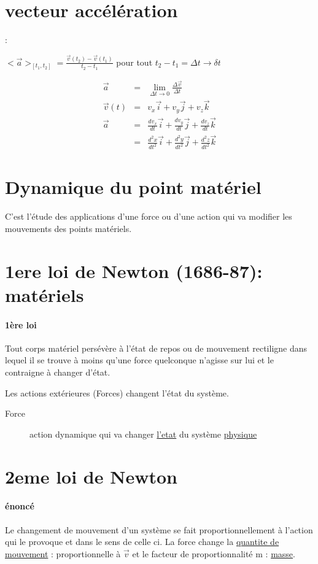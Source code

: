 \section{vecteur accélération} : 

$<\vec{a}>_{[t_1, t_2]} = \frac{\vec{v}(t_2)-\vec{v}(t_1)}{t_2-t_1}$ pour tout $t_2-t_1 = \Delta t \to \delta t$

\[\begin{array}{rcl}
	\vec{a} &=& \lim_{\Delta t \to 0} \frac{\Delta \vec{v}}{\Delta t} \\
		\vec{v}(t) &=& v_x\vec{i}+v_y\vec{j} + v_z\vec{k} \\
		\vec{a} &=& \frac{dv_x}{dt}\vec{i}+\frac{dv_y}{dt}\vec{j}+\frac{dv_z}{dt}\vec{k} \\
		&=& \frac{d^2x}{dt^2}\vec{i}+\frac{d^2y}{dt^2}\vec{j}+\frac{d^2z}{dt^2}\vec{k} 
\end{array}\]

\section{Dynamique du point matériel}

C'est l'étude des applications d'une force ou d'une action qui va modifier les mouvements des points matériels.
\section{1ere loi de Newton (1686-87): matériels}

\paragraph{1ère loi} Tout corps matériel persévère à l'état de repos ou de mouvement rectiligne dans lequel il se trouve à moins qu'une force quelconque n'agisse sur lui et le contraigne à changer d'état.

Les actions extérieures (Forces) changent l'état du système.

\begin{description}
	\item[Force] action dynamique qui va changer \ul{l'etat} du système \ul{physique}
\end{description}

\section{2eme loi de Newton}
\paragraph{énoncé} Le changement de mouvement d'un système se fait proportionnellement à l'action qui le provoque et dans le sens de celle ci.
La force change la \ul{quantite de mouvement} : proportionnelle à $\vec{v}$ et le facteur de proportionnalité m : \ul{masse}.

